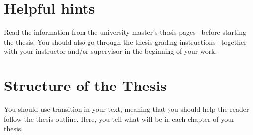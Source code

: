 \section{Helpful hints}

Read the information from the university master's thesis
pages~\cite{ThesisInstructions} before starting the thesis.  You
should also go through the thesis grading
instructions~\cite{ThesisGrading} together with your instructor and/or
supervisor in the beginning of your work.

\section{Structure of the Thesis}
\label{section:structure}

You should use transition in your text, meaning that you should help
the reader follow the thesis outline. Here, you tell what will be in
each chapter of your thesis. 

